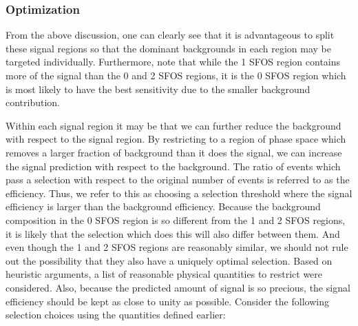\subsubsection{Optimization}
\label{sec:optimization}
From the above discussion, one can clearly see that it is
advantageous to split these signal regions so that the dominant
backgrounds in each region may be targeted individually.  Furthermore,
note that while the 1 SFOS region contains more of the signal than the
0 and 2 SFOS regions, it is the 0 SFOS region which is most likely to
have the best sensitivity due to the smaller background contribution.

Within each signal region it may be that we can further reduce the 
background with respect to the signal region. 
By restricting to a region of phase space which removes a larger
fraction of background than it does the signal, we can 
increase the signal prediction with respect to the background.
The ratio of events which pass a selection with respect
to the original number of events is referred to as the 
efficiency.
Thus, we refer to this as choosing a selection threshold where 
the signal efficiency is larger than the background efficiency.
Because the background composition in the 0 SFOS region
is so different from the 1 and 2 SFOS regions, it is likely that
the selection which does this will also differ between them. 
And even though the
1 and 2 SFOS regions are reasonably similar, we should not rule out
the possibility that they also have a uniquely optimal selection.
Based on heuristic arguments, a list of reasonable physical
quantities to restrict were considered. 
Also, because the predicted amount of signal is so precious,
the signal efficiency should be kept as close to unity as possible.
Consider the following selection choices using the quantities defined
earlier:
